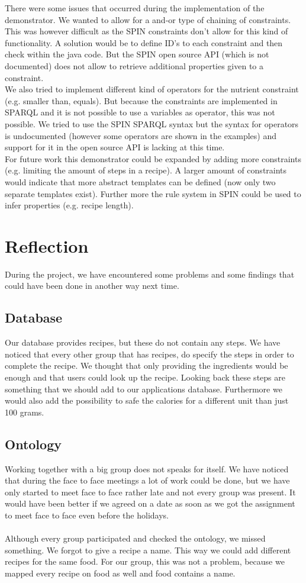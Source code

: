 There were some issues that occurred during the implementation of the demonstrator. We wanted to allow for a and-or type of chaining of constraints. This was however difficult as the SPIN constraints don't allow for this kind of functionality. A solution would be to define ID's to each constraint and then check within the java code. But the SPIN open source API (which is not documented) does not allow to retrieve additional properties given to a constraint.\\
We also tried to implement different kind of operators for the nutrient constraint (e.g. smaller than, equals). But because the constraints are implemented in SPARQL and it is not possible to use a variables as operator, this was not possible. We tried to use the SPIN SPARQL syntax but the syntax for operators is undocumented (however some operators are shown in the examples) and support for it in the open source API is lacking at this time.\\
For future work this demonstrator could be expanded by adding more constraints (e.g. limiting the amount of steps in a recipe). A larger amount of constraints would indicate that more abstract templates can be defined (now only two separate templates exist). Further more the rule system in SPIN could be used to infer properties (e.g. recipe length).

\section{Reflection}
During the project, we have encountered some problems and some findings that could have been done in another way next time. 
\subsection*{Database} 
Our database provides recipes, but these do not contain any steps. We have noticed that every other group that has recipes, do specify the steps in order to complete the recipe. We thought that only providing the ingredients would be enough and that users could look up the recipe. Looking back these steps are something that we should add to our applications database. Furthermore we would also add the possibility to safe the calories for a different unit than just 100 grams. 
\subsection*{Ontology} 
Working together with a big group does not speaks for itself. We have noticed that during the face to face meetings a lot of work could be done, but we have only started to meet face to face rather late and not every group was present. It would have been better if we agreed on a date as soon as we got the assignment to meet face to face even before the holidays.  
\\ \\  
Although every group participated and checked the ontology, we missed something. We forgot to give a recipe a name. This way we could add different recipes for the same food. For our group, this was not a problem, because we mapped every recipe on food as well and food contains a name. 
